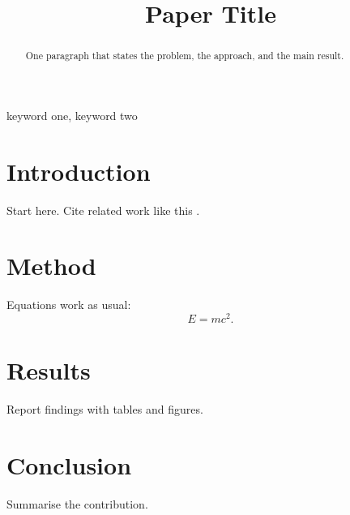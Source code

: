 \documentclass[conference]{IEEEtran}
\begin{document}
\title{Paper Title}

\author{
\and
{}
}

\maketitle

\begin{abstract}
One paragraph that states the problem, the approach, and the main result.
\end{abstract}

\begin{IEEEkeywords}
keyword one, keyword two
\end{IEEEkeywords}

\section{Introduction}
Start here. Cite related work like this \cite{knuth1984, lamport1986}.

\section{Method}
Equations work as usual:
\begin{equation}
  E = mc^2 .
  \label{eq:energy}
\end{equation}

\section{Results}
Report findings with tables and figures.

\section{Conclusion}
Summarise the contribution.



\end{document}
